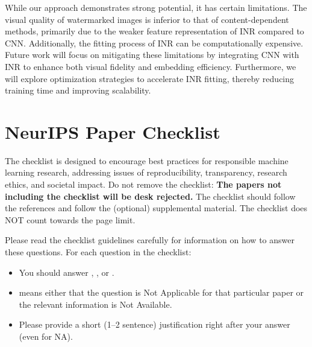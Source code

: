 \documentclass{article}
\begin{document}
While our approach demonstrates strong potential, it has certain limitations. The visual quality of watermarked images is inferior to that of content-dependent methods, primarily due to the weaker feature representation of INR compared to CNN. Additionally, the fitting process of INR can be computationally expensive. Future work will focus on mitigating these limitations by integrating CNN with INR to enhance both visual fidelity and embedding efficiency. Furthermore, we will explore optimization strategies to accelerate INR fitting, thereby reducing training time and improving scalability.




\newpage
\section*{NeurIPS Paper Checklist}

The checklist is designed to encourage best practices for responsible machine learning research, addressing issues of reproducibility, transparency, research ethics, and societal impact. Do not remove the checklist: {\bf The papers not including the checklist will be desk rejected.} The checklist should follow the references and follow the (optional) supplemental material.  The checklist does NOT count towards the page
limit. 

Please read the checklist guidelines carefully for information on how to answer these questions. For each question in the checklist:
\begin{itemize}
    \item You should answer \answerYes{}, \answerNo{}, or \answerNA{}.
    \item \answerNA{} means either that the question is Not Applicable for that particular paper or the relevant information is Not Available.
    \item Please provide a short (1–2 sentence) justification right after your answer (even for NA). 
\end{itemize}
\end{document}
